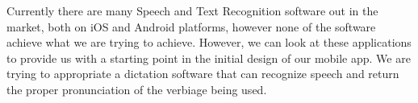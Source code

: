 Currently there are many Speech and Text Recognition software out in the market, both on iOS and Android platforms, however none of the software achieve what we are trying to achieve. However, we can look at these applications to provide us with a starting point in the initial design of our mobile app. We are trying to appropriate a dictation software that can recognize speech and return the proper pronunciation of the verbiage being used.
